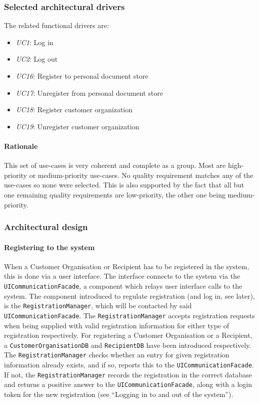 \documentclass[a4paper,10pt]{article}
\begin{document}
\subsubsection{Selected architectural drivers}

The related functional drivers are:

\begin{itemize}
    \item \emph{UC1}: Log in
    \item \emph{UC2}: Log out
    \item \emph{UC16}: Register to personal document store
    \item \emph{UC17}: Unregister from personal document store
    \item \emph{UC18}: Register customer organization
    \item \emph{UC19}: Unregister customer organization
\end{itemize}

\paragraph{Rationale}
This set of use-cases is very coherent and complete as a group. Most are high-priority or medium-priority use-cases. No quality requirement matches any of the use-cases so none were selected. This is also supported by the fact that all but one remaining quality requirements are low-priority, the other one being medium-priority.

\subsubsection{Architectural design}

\paragraph{Registering to the system}
When a Customer Organisation or Recipient has to be registered in the system, this is done via a user interface. The interface connects to the system via the \texttt{UICommunicationFacade}, a component which relays user interface calls to the system. The component introduced to regulate registration (and log in, see later), is the \texttt{RegistrationManager}, which will be contacted by said \texttt{UICommunicationFacade}. The \texttt{RegistrationManager} accepts registration requests when being supplied with valid registration information for either type of registration respectively. For registering a Customer Organisation or a Recipient, a \texttt{CustomerOrganisationDB} and \texttt{RecipientDB} have been introduced respectively. The \texttt{RegistrationManager} checks whether an entry for given registration information already exists, and if so, reports this to the \texttt{UICommunicationFacade}. If not, the \texttt{RegistrationManager} records the registration in the correct database and returns a positive answer to the \texttt{UICommunicationFacade}, along with a login token for the new registration (see ``Logging in to and out of the system'').
\end{document}
